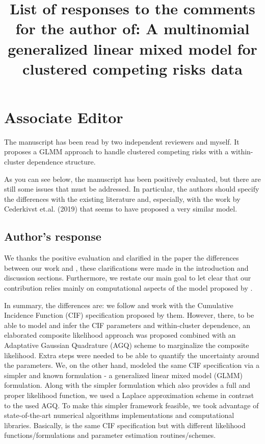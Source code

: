 \documentclass[a4paper,12pt]{article}
\title{

  List of responses to the comments for the author of:
  A multinomial generalized linear mixed model for clustered competing
  risks data

}
\begin{document}
\maketitle

\section*{Associate Editor}

The manuscript has been read by two independent reviewers and myself. It
proposes a GLMM approach to handle clustered competing risks with a
within-cluster dependence structure.

As you can see below, the manuscript has been positively evaluated, but
there are still some issues that must be addressed. In particular, the
authors should specify the differences with the existing literature and,
especially, with the work by Cederkivst et.al. (2019) that seems to have
proposed a very similar model.

\subsection*{Author's response}

We thanks the positive evaluation and clarified in the paper the
differences between our work and \cite{SCHEIKE}, these clarifications
were made in the introduction and discussion sections.  Furthermore, we
restate our main goal to let clear that our contribution relies mainly
on computational aspects of the model proposed by \cite{SCHEIKE}.

In summary, the differences are: we follow \cite{SCHEIKE} and work with
the Cumulative Incidence Function (CIF) specification proposed by
them. However, there, to be able to model and infer the CIF parameters
and within-cluster dependence, an elaborated composite likelihood
approach was proposed combined with an Adaptative Gaussian Quadrature
(AGQ) scheme to marginalize the composite likelihood. Extra steps were
needed to be able to quantify the uncertainty around the parameters. We,
on the other hand, modeled the same CIF specification via a simpler and
known formulation - a generalized linear mixed model (GLMM)
formulation. Along with the simpler formulation which also provides a
full and proper likelihood function, we used a Laplace approximation
scheme in contrast to the used AGQ. To make this simpler framework
feasible, we took advantage of state-of-the-art numerical algorithms
implementations and computational libraries. Basically, is the same CIF
specification but with different likelihood functions/formulations and
parameter estimation routines/schemes.
\end{document}
